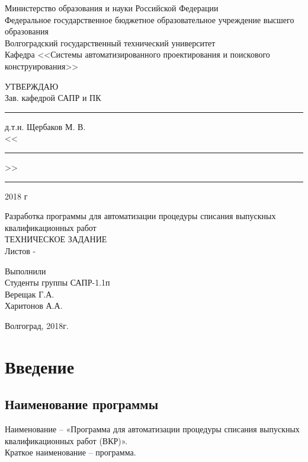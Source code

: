 \documentclass[14pt, a4paper]{extarticle}
\begin{document}
	\begin{center}
		Министерство образования и науки Российской Федерации\\
		Федеральное государственное бюджетное образовательное учреждение высшего образования\\
		Волгоградский государственный технический университет\\
		Кафедра <<Системы автоматизированного проектирования и поискового конструирования>>
	\end{center}
	\vspace{70pt}
	\begin{flushright}
		УТВЕРЖДАЮ\\
		Зав. кафедрой САПР и ПК\\
		\rule{25mm}{0.4pt} д.т.н. Щербаков М. В.\\
		<<\rule{7mm}{0.4pt}>> \rule{35mm}{0.4pt} 2018 г
	\end{flushright}
	
	\begin{center}
		\Large Разработка программы для автоматизации процедуры списания выпускных квалификационных работ\\
		\vspace{30pt}
		\normalsize ТЕХНИЧЕСКОЕ ЗАДАНИЕ\\
		Листов - \pageref{LastPage}\\
	\end{center}

	\vspace{70pt}
	\begin{flushright}
		Выполнили\\
		Студенты группы САПР-1.1п\\
		Верещак Г.А.\\
		Харитонов А.А.
	\end{flushright}
	
	\vspace*{\fill}
	\begin{center}
		Волгоград, 2018г.\\
	\end{center}
	\newpage
	
	\setcounter{page}{2}
	\tableofcontents
	\newpage
	
	\section{Введение}
	\subsection{Наименование программы}
	Наименование – «Программа для автоматизации процедуры списания выпускных квалификационных работ (ВКР)». \\Краткое наименование – программа.
\end{document}
